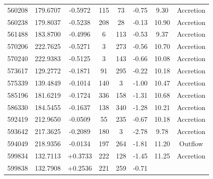 \documentclass[fleqn,usenatbib]{mnras}
\begin{document}
\begin{table}
\begin{tabular*}{\linewidth}{cccccccc}
560208                    & 179.6707 & -0.5972  & 115                           & 73                          & -0.75%
& 9.30%
& Accretion          \\
560238                    & 179.8037 & -0.5238  & 208                           & 28                          & -0.13%
& 10.90%
& Accretion          \\
561488                    & 183.8700 & -0.4996  & 6                             & 113                         & -0.53%
& 9.37%
& Accretion          \\
570206                    & 222.7625 & -0.5271  & 3                             & 273                         & -0.56%
& 10.70%
& Accretion          \\
570240                    & 222.9383 & -0.5125  & 3                             & 143                         & -0.66%
& 10.08%
& Accretion          \\
573617                    & 129.2772 & -0.1871  & 91                            & 295                         & -0.22%
& 10.18%
& Accretion          \\
575339                    & 139.4849 & -0.1014  & 140                           & 3                           & -1.00%
& 10.47%
& Accretion          \\
585196                    & 181.6219 & -0.1724  & 336                           & 158                         & -1.31%
& 10.68%
& Accretion          \\
586330                    & 184.5455 & -0.1637  & 138                           & 340                         & -1.28%
& 10.21%
& Accretion          \\
592419                    & 212.9650 & -0.0509  & 55                            & 235                         & -0.67%
& 10.18%
& Accretion          \\
593642                    & 217.3625 & -0.2089  & 180                           & 3                           & -2.78%
& 9.78%
& Accretion          \\
594049                    & 218.9356 & -0.0134  & 197                           & 264                         & -1.81%
& 11.20%
& Outflow            \\
599834                    & 132.7113 & +0.3733  & 222                           & 128                         & -1.45%
& 11.25%
& Accretion          \\
599838                    & 132.7908 & +0.2536  & 221                           & 259                         & -0.71%

\end{tabular*}
\end{table}
\end{document}
